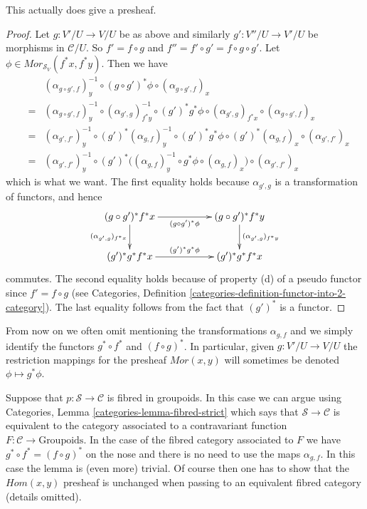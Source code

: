 \begin{lemma}
\label{lemma-painfull}
This actually does give a presheaf.
\end{lemma}

\begin{proof}
Let $g : V'/U \to V/U$ be as above and similarly
$g' : V''/U \to V'/U$ be morphisms in $\mathcal{C}/U$.
So $f' = f \circ g$ and $f'' = f' \circ g' = f \circ g \circ g'$.
Let $\phi \in {Mor}_{\mathcal{S}_V}(f^\ast x, f^\ast y)$.
Then we have
\begin{eqnarray*}
& &
(\alpha_{g \circ g', f})_y^{-1} \circ
(g \circ g')^\ast \phi \circ
(\alpha_{g \circ g', f})_x
\\
& = &
(\alpha_{g \circ g', f})_y^{-1} \circ
(\alpha_{g', g})_{f^*y}^{-1} \circ
(g')^*g^\ast \phi \circ
(\alpha_{g', g})_{f^*x} \circ
(\alpha_{g \circ g', f})_x
\\
& = &
(\alpha_{g', f'})_y^{-1} \circ
(g')^*(\alpha_{g, f})_y^{-1} \circ
(g')^* g^\ast \phi \circ
(g')^*(\alpha_{g, f})_x
\circ
(\alpha_{g', f'})_x
\\
& = &
(\alpha_{g', f'})_y^{-1} \circ
(g')^*\Big(
(\alpha_{g, f})_y^{-1} \circ
g^\ast \phi \circ
(\alpha_{g, f})_x
\Big) \circ
(\alpha_{g', f'})_x
\end{eqnarray*}
which is what we want. The first equality holds because
$\alpha_{g', g}$ is a transformation of functors, and hence
$$
\xymatrix{
(g \circ g')^*f^*x
\ar[rr]_{(g \circ g')^\ast \phi}
\ar[d]_{(\alpha_{g', g})_{f^*x}} & &
(g \circ g')^*f^*y
\ar[d]^{(\alpha_{g', g})_{f^*y}} \\
(g')^*g^*f^*x
\ar[rr]^{(g')^*g^\ast \phi} & &
(g')^*g^*f^*x
}
$$
commutes. The second equality holds because of property (d) of
a pseudo functor since $f' = f \circ g$ (see
Categories, Definition \ref{categories-definition-functor-into-2-category}).
The last equality follows from the fact that $(g')^*$ is a functor.
\end{proof}

\noindent
From now on we often omit mentioning the transformations
$\alpha_{g, f}$ and we simply identify the functors
$g^* \circ f^*$ and $(f \circ g)^*$. In particular,
given $g : V'/U \to V/U$ the restriction
mappings for the presheaf $\mathit{Mor}(x, y)$
will sometimes be denoted $\phi \mapsto g^*\phi$.

\begin{remark}
\label{remark-alternative}
Suppose that $p : \mathcal{S} \to \mathcal{C}$ is fibred in groupoids.
In this case we can argue using
Categories, Lemma \ref{categories-lemma-fibred-strict}
which says that $\mathcal{S} \to \mathcal{C}$ is equivalent to the
category associated to a contravariant function
$F : \mathcal{C} \to \text{Groupoids}$.
In the case of the fibred category associated to $F$
we have $g^* \circ f^* = (f \circ g)^*$ on the nose
and there is no need to use the maps $\alpha_{g, f}$.
In this case the lemma is (even more) trivial. Of course then
one has to show that the $\mathit{Hom}(x, y)$ presheaf is
unchanged when passing to an equivalent fibred category (details
omitted).
\end{remark}

